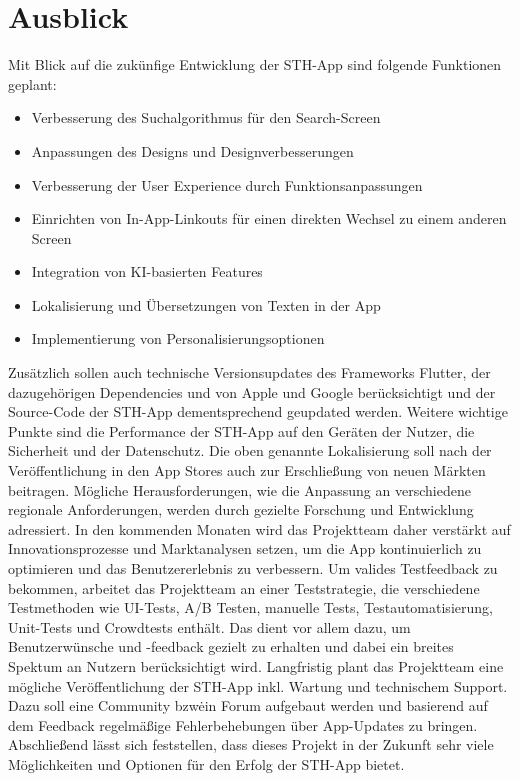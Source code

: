 \chapter{Ausblick}
Mit Blick auf die zukünfige Entwicklung der STH-App sind folgende Funktionen geplant:
\begin{itemize}
    \item Verbesserung des Suchalgorithmus für den Search-Screen
    \item Anpassungen des Designs und Designverbesserungen
    \item Verbesserung der User Experience durch Funktionsanpassungen 
    \item Einrichten von In-App-Linkouts für einen direkten Wechsel zu einem anderen Screen
    \item Integration von KI-basierten Features
    \item Lokalisierung und Übersetzungen von Texten in der App
    \item Implementierung von Personalisierungsoptionen
\end{itemize}
Zusätzlich sollen auch technische Versionsupdates des Frameworks Flutter, der dazugehörigen Dependencies und von Apple und Google berücksichtigt und der Source-Code der STH-App dementsprechend geupdated werden.
Weitere wichtige Punkte sind die Performance der STH-App auf den Geräten der Nutzer, die Sicherheit und der Datenschutz.
Die oben genannte Lokalisierung soll nach der Veröffentlichung in den App Stores auch zur Erschließung von neuen Märkten beitragen.
Mögliche Herausforderungen, wie die Anpassung an verschiedene regionale Anforderungen, werden durch gezielte Forschung und Entwicklung adressiert.
In den kommenden Monaten wird das Projektteam daher verstärkt auf Innovationsprozesse und Marktanalysen setzen, um die App kontinuierlich zu optimieren und das Benutzererlebnis zu verbessern.\newline
Um valides Testfeedback zu bekommen, arbeitet das Projektteam an einer Teststrategie, die verschiedene Testmethoden wie UI-Tests, A/B Testen, manuelle Tests, Testautomatisierung, Unit-Tests und Crowdtests enthält.
Das dient vor allem dazu, um Benutzerwünsche und -feedback gezielt zu erhalten und dabei ein breites Spektum an Nutzern berücksichtigt wird.\newline
Langfristig plant das Projektteam eine mögliche Veröffentlichung der STH-App inkl. Wartung und technischem Support.
Dazu soll eine Community bzw\. ein Forum aufgebaut werden und basierend auf dem Feedback regelmäßige Fehlerbehebungen über App-Updates zu bringen.\newline
Abschließend lässt sich feststellen, dass dieses Projekt in der Zukunft sehr viele Möglichkeiten und Optionen für den Erfolg der STH-App bietet.